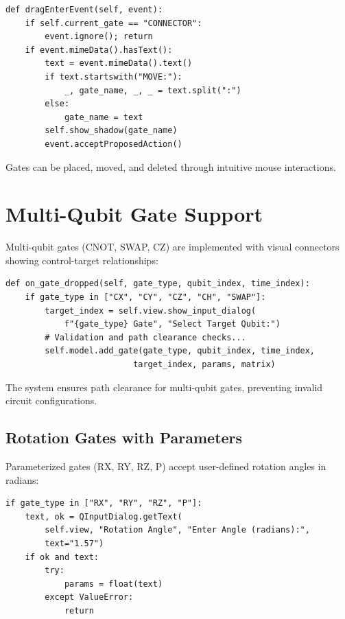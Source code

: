 \documentclass[12pt, a4paper, oneside]{report}
\theoremstyle{plain}
\theoremstyle{definition}
\theoremstyle{remark}
\begin{document}
\begin{listing}[ht]
\begin{verbatim}
def dragEnterEvent(self, event):
    if self.current_gate == "CONNECTOR": 
        event.ignore(); return
    if event.mimeData().hasText():
        text = event.mimeData().text()
        if text.startswith("MOVE:"):
            _, gate_name, _, _ = text.split(":")
        else:
            gate_name = text
        self.show_shadow(gate_name)
        event.acceptProposedAction()
\end{verbatim}
\caption{DropLabel Drag Event Handler}
\end{listing}

Gates can be placed, moved, and deleted through intuitive mouse interactions.

\section{Multi-Qubit Gate Support}
Multi-qubit gates (CNOT, SWAP, CZ) are implemented with visual connectors showing control-target relationships:

\begin{listing}[ht]
\begin{verbatim}
def on_gate_dropped(self, gate_type, qubit_index, time_index):
    if gate_type in ["CX", "CY", "CZ", "CH", "SWAP"]:
        target_index = self.view.show_input_dialog(
            f"{gate_type} Gate", "Select Target Qubit:")
        # Validation and path clearance checks...
        self.model.add_gate(gate_type, qubit_index, time_index, 
                          target_index, params, matrix)
\end{verbatim}
\caption{Multi-Qubit Gate Placement Logic}
\end{listing}

The system ensures path clearance for multi-qubit gates, preventing invalid circuit configurations.

\subsection{Rotation Gates with Parameters}
Parameterized gates (RX, RY, RZ, P) accept user-defined rotation angles in radians:

\begin{listing}[ht]
\begin{verbatim}
if gate_type in ["RX", "RY", "RZ", "P"]:
    text, ok = QInputDialog.getText(
        self.view, "Rotation Angle", "Enter Angle (radians):", 
        text="1.57")
    if ok and text:
        try: 
            params = float(text)
        except ValueError: 
            return
\end{verbatim}
\caption{Parameterized Gate Input}
\end{listing}
\end{document}

